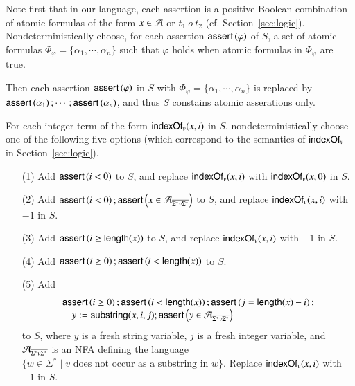 \smallskip
Note first that in our language, each assertion is a positive Boolean combination of atomic formulas of the form $x\in \mathcal{A}$ or $t_1\ o\ t_2$ (cf. Section~\ref{sec:logic}).  
Nondeterministically choose, for each assertion $\textsf{assert}\left(\varphi\right)$ of $S$, a set of atomic formulas $\Phi_\varphi = \{\alpha_1,\cdots,\alpha_n\}$ such that $\varphi$ holds when atomic formulas in $\Phi_\varphi$ are true.  %

Then each assertion $\textsf{assert}\left(\varphi\right)$ in $S$ with $\Phi_\varphi = \{\alpha_1,\cdots,\alpha_n\}$ is replaced by $\textsf{assert}\left(\alpha_1\right); \cdots; \textsf{assert}\left(\alpha_n\right)$, and thus $S$ constains atomic asserations only. 

\medskip 
{}%

\smallskip

For each integer term of the form $\mathsf{indexOf}_v(x,i)$ in $S$, nondeterministically choose one of the following five options (which correspond to the semantics of $\mathsf{indexOf}_v$ in Section~\ref{sec:logic}).
\begin{itemize}
\item[(1)] Add $\textsf{assert}\left(i < 0\right)$ to $S$, and replace $\mathsf{indexOf}_v(x,i)$ with $\mathsf{indexOf}_v(x,0)$ in $S$. 
%
\item[(2)] Add $\textsf{assert}\left(i < 0\right);\textsf{assert}\left(x \in \mathcal{A}_{\overline{\Sigma^*v\Sigma^*}}\right)$ to $S$, and replace $\mathsf{indexOf}_v(x,i)$ with $-1$ in $S$.
%
\item[(3)] Add $\textsf{assert}\left(i \ge \mathsf{length}(x)\right)$ to $S$, and replace $\mathsf{indexOf}_v(x,i)$ with $-1$ in $S$.
%
\item[(4)] Add $\textsf{assert}\left(i \ge 0\right); \textsf{assert}\left(i < \mathsf{length}(x)\right)$ to $S$.
%
\item[(5)] Add 
%
$$
\begin{array}{l}
\textsf{assert}\left(i \ge 0\right); \textsf{assert}\left(i < \mathsf{length}(x)\right); \textsf{assert}\left(j=\mathsf{length}(x)-i\right); \\
\ \ \ \ y:=\mathsf{substring}(x, i, j); \textsf{assert}\left(y \in \mathcal{A}_{\overline{\Sigma^*v\Sigma^*}}\right)
\end{array}
$$ 
to $S$, where $y$ is a fresh string variable, $j$ is a fresh integer variable, and $\mathcal{A}_{\overline{\Sigma^*v\Sigma^*}}$ is an NFA defining the language $\{w \in \Sigma^*\mid v \mbox{ does not occur as a substring in } w\}$. Replace $\mathsf{indexOf}_v(x, i)$ with $-1$ in $S$.
\end{itemize}


